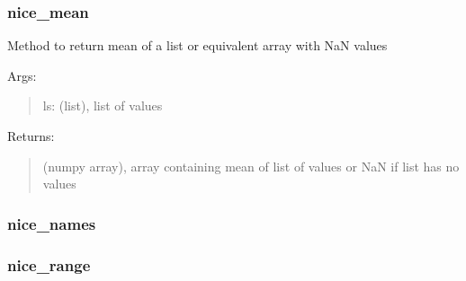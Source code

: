 \documentclass[letterpaper,10pt,english]{sphinxmanual}
\begin{document}
\subsubsection{nice\_mean}
\label{\detokenize{api/mastml.plots.nice_mean:nice-mean}}\label{\detokenize{api/mastml.plots.nice_mean::doc}}

\begin{fulllineitems}
\label{\detokenize{api/mastml.plots.nice_mean:mastml.plots.nice_mean}}
Method to return mean of a list or equivalent array with NaN values

Args:
\begin{quote}

ls: (list), list of values
\end{quote}

Returns:
\begin{quote}

(numpy array), array containing mean of list of values or NaN if list has no values
\end{quote}

\end{fulllineitems}



\subsubsection{nice\_names}
\label{\detokenize{api/mastml.plots.nice_names:nice-names}}\label{\detokenize{api/mastml.plots.nice_names::doc}}

\begin{fulllineitems}
\label{\detokenize{api/mastml.plots.nice_names:mastml.plots.nice_names}}
\end{fulllineitems}



\subsubsection{nice\_range}
\label{\detokenize{api/mastml.plots.nice_range:nice-range}}\label{\detokenize{api/mastml.plots.nice_range::doc}}
\end{document}

